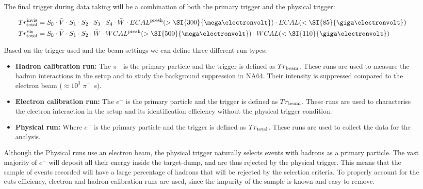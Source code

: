 The final trigger during data taking will be a combination of both the primary trigger and the physical trigger:

\begin{equation}
\label{eq:trigger-total}
\begin{split}
& Tr^{\rm{invis}}_{\rm{total}} = S_0 \cdot \bar{V} \cdot S_1 \cdot S_2 \cdot S_3 \cdot S_4 \cdot \bar{W} \cdot ECAL^{\rm{presh}}(> \SI{300}{\mega\electronvolt}) \cdot ECAL(<\SI{85}{\giga\electronvolt})\\
& Tr^{\rm{vis}}_{\rm{total}} = S_0 \cdot \bar{V} \cdot S_1 \cdot S_2\cdot \bar{W} \cdot WCAL^{\rm{presh}}(>\SI{500}{\mega\electronvolt}) \cdot WCAL(<\SI{110}{\giga\electronvolt})
\end{split}
\end{equation}

Based on the trigger used and the beam settings we can define three different run types:

\begin{itemize}
\item \textbf{Hadron calibration run:} The $\pi^-$ is the primary particle and the trigger is defined as $Tr_{\rm{beam}}$. These runs are used to measure the hadron interactions in the setup and to study the background suppression in NA64. Their intensity is suppressed compared to the electron beam ($\approx 10^{3}$ $\pi^-$\si{\per\second}).
\item \textbf{Electron calibration run:} The $e^-$ is the primary particle and the trigger is defined as $Tr_{\rm{beam}}$. These runs are used to characterise the electron interaction in the setup and its identification efficiency without the physical trigger condition. 

\item \textbf{Physical run:} Where $e^-$ is the primary particle and the trigger is defined as $Tr_{\rm{total}}$. These runs are used to collect the data for the analysis. 
\end{itemize}

Although the Physical runs use an electron beam, the physical trigger naturally selects events with hadrons as a primary particle. The vast majority of $e^-$ will deposit all their energy inside the target-dump, and are thus rejected by the physical trigger. This means that the sample of events recorded will have a large percentage of hadrons that will be rejected by the selection criteria. To properly account for the cuts efficiency, electron and hadron calibration runs are used, since the impurity of the sample is known and easy to remove.

